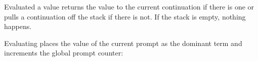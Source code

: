 Evaluated a value returns the value to the current continuation if there is one or pulls a continuation off the stack if there is not. If the stack is empty, nothing happens.
\begin{comment}
eval (State (Val v) d es q) = case d of
  Hole -> case es of
    (e:es') -> case e of
      (Val (Prompt p)) -> State (Val v) Hole es' q
      otherwise -> State (Val v) e es' q
    otherwise -> State (Val v) d es q
  otherwise -> State (ret d (Val v)) Hole es q
\end{comment}
\begin{Shaded}
\begin{Highlighting}[]
 \NormalTok{(} \FunctionTok{=}  
   \OtherTok{->}  
    \FunctionTok{:}\OtherTok{->}  
      \NormalTok{(} \NormalTok{(} \OtherTok{->}  \NormalTok{(}  
      \OtherTok{->}  \NormalTok{(} 
    \OtherTok{->}  \NormalTok{(} 
  \OtherTok{->}    
\end{Highlighting}
\end{Shaded}

Evaluating  places the value of the current prompt as the dominant term and increments the global prompt counter:
\begin{comment}
eval (State NewPrompt d es (Prompt p)) = State (Val (Prompt p)) 
                                               d es (Prompt $ p+1)
\end{comment}
\begin{Shaded}
\begin{Highlighting}[]
   \FunctionTok{=}  \NormalTok{(} \NormalTok{(} 
                                                \FunctionTok{$} \FunctionTok{+}\NormalTok{)}
\end{Highlighting}
\end{Shaded}


